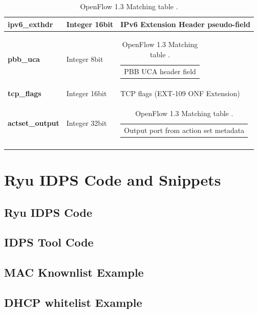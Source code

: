 \documentclass[12pt, oneside]{book}
\begin{document}
\begin{longtable}{|l|l|l|}
	\textbf{ipv6\_exthdr}     & Integer 16bit  & IPv6 Extension Header pseudo-field                                                                     \\ \hline
	\textbf{pbb\_uca}         & Integer 8bit   & \begin{tabular}[c]{@{}l@{}}PBB UCA header field\end{tabular}  \\ \hline
	\textbf{tcp\_flags}       & Integer 16bit  & TCP flags (EXT-109 ONF Extension)                                                                      \\ \hline
	\textbf{actset\_output}   & Integer 32bit  & \begin{tabular}[c]{@{}l@{}}Output port from action set metadata\end{tabular} \\ \hline
	\caption[An optional table caption]{OpenFlow 1.3 Matching table \cite{ryusdnframework}.\label{table:openflow13match}}\\
\end{longtable}


\newpage
\section{Ryu IDPS Code and Snippets}
\subsection{Ryu IDPS Code}

\subsection{IDPS Tool Code}

\subsection{MAC Knownlist Example}

\subsection{DHCP whitelist Example}

\end{document}
